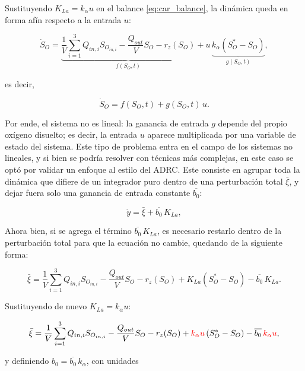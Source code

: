Sustituyendo $K_{La}=k_\alpha u$ en el balance \eqref{eq:car_balance}, la
dinámica queda en forma afín respecto a la entrada $u$:

\begin{equation}
\dot S_O
=
\underbrace{
\frac{1}{V}\sum_{i=1}^3 Q_{in,i}S_{O_{in,i}}
-\frac{Q_{out}}{V}S_O
-r_z(S_O)
}_{f(S_O,t)}
+
u\,
\underbrace{
k_\alpha\left(S^{*}_O-S_O\right)
}_{g(S_O,t)},
\end{equation}

es decir,

\begin{equation}
\dot S_O = f(S_O,t) + g(S_O,t)\,u .
\label{eq:car_afin}
\end{equation}

Por ende, el sistema no es lineal: la ganancia de entrada $g$ depende del
propio oxígeno disuelto; es decir, la entrada $u$ aparece multiplicada por
una variable de estado del sistema. Este tipo de problema entra en el campo de
los sistemas no lineales, y si bien se podría resolver con técnicas más
complejas, en este caso se optó por
validar un enfoque al estilo del ADRC. Este consiste en agrupar toda la
dinámica que difiere de un integrador puro dentro de una perturbación total
$\bar{\xi}$, y dejar fuera solo una ganancia de entrada constante $\overline{b_0}$:

\begin{equation}
    \dot{y} = \bar{\xi} + \overline{b_0}\, K_{La},
\end{equation}

Ahora bien, si se agrega el término $\overline{b_0}\, K_{La}$, es necesario
restarlo dentro de la perturbación total para que la ecuación no cambie,
quedando de la siguiente forma:

\begin{equation}
\bar{\xi}
=
\frac{1}{V}\sum_{i=1}^3 Q_{in,i}S_{O_{in,i}}
-\frac{Q_{out}}{V}S_O
-r_z(S_O)+K_{La}\left(S^{*}_O-S_O\right)-\overline{b_0}\, K_{La}.
\end{equation}

Sustituyendo de nuevo $K_{La} = k_\alpha u$:


\begin{equation}
\bar{\xi}
=
\frac{1}{V}\sum_{i=1}^3 Q_{in,i}S_{O_{in,i}}
-\frac{Q_{out}}{V}S_O
-r_z(S_O)
+ {\color{red}{k_\alpha u}} \left(S^{*}_O-S_O\right)
-\overline{b_0}\, {\color{red}{k_\alpha u}},
\label{ecu:disturbance}
\end{equation}

y definiendo $b_0 = \overline{b_0}\, k_\alpha$, con unidades

